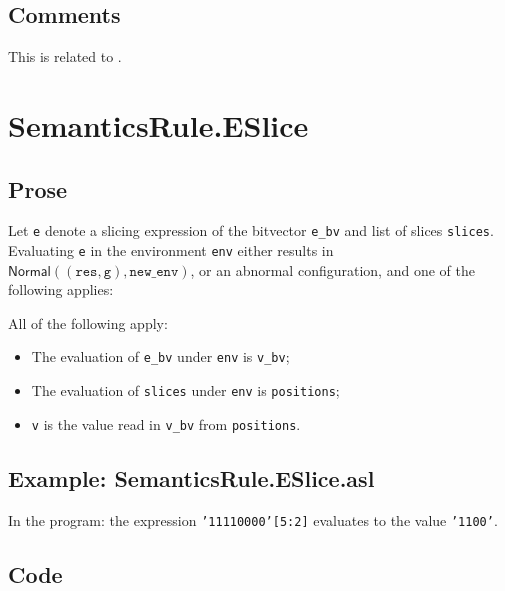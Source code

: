 \documentclass{book}
\newcommand\Normal[0]{\textsf{Normal}}
\newcommand\newenv[0]{\texttt{new\_env}}
\newcommand\vg[0]{\texttt{g}}
\newcommand\vres[0]{\texttt{res}}
\begin{document}
  \subsection{Comments}
  This is related to .

\section{SemanticsRule.ESlice \label{sec:SemanticsRule.ESlice}}

  \subsection{Prose}
  Let \texttt{e} denote a slicing expression of the bitvector \texttt{e\_bv} and list of slices \texttt{slices}.
  Evaluating \texttt{e} in the environment \texttt{env} either results in $\Normal((\vres,\vg),\newenv)$,
  or an abnormal configuration, and one of the following applies:

  All of the following apply:
  \begin{itemize}
  \item The evaluation of \texttt{e\_bv} under \texttt{env} is \texttt{v\_bv};
  \item The evaluation of \texttt{slices} under \texttt{env} is \texttt{positions};
  \item \texttt{v} is the value read in \texttt{v\_bv} from \texttt{positions}.
  \end{itemize}

  \subsection{Example: SemanticsRule.ESlice.asl}
    In the program:
    the expression \texttt{'11110000'[5:2]} evaluates to the value \texttt{'1100'}.

  \subsection{Code}
\end{document}
